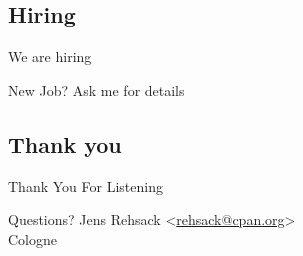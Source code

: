 \documentclass[ngerman,xcolor={table,dvipsnames},smaller,compress,hyperref={bookmarks,colorlinks}]{beamer}%
\begin{document}
\subsection{Hiring}

\begin{frame}[fragile]{We are hiring}
\begin{block}{New Job?}
Ask me for details
\end{block}
\end{frame}

\subsection{Thank you}

\begin{frame}[fragile]{Thank You For Listening}
\begin{block}{Questions?}
Jens Rehsack \textless{}\href{mailto:rehsack@cpan.org}{rehsack@cpan.org}\textgreater{} \\
Cologne
\end{block}
\end{frame}
\end{document}
